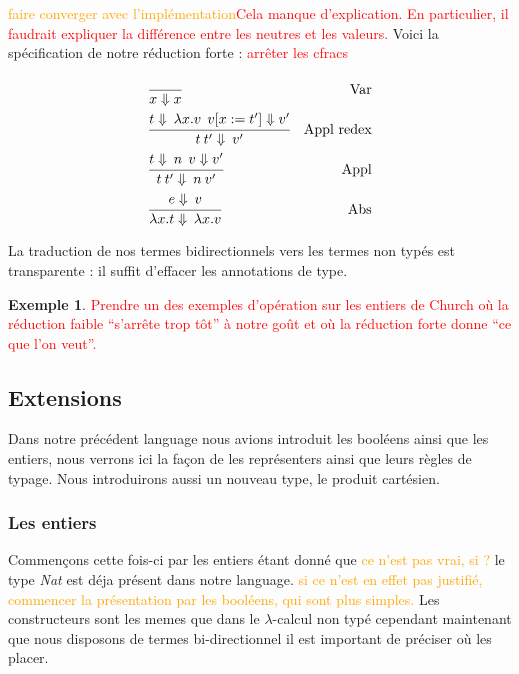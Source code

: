 \documentclass {article}
\theoremstyle{definition}
\newtheorem{example}{Exemple}
\theoremstyle{remark}
\newcommand{\todo}[1]{\textcolor{red}{#1}}
\newcommand{\attention}[1]{\textcolor{orange}{#1}}
\begin{document}
\attention{faire converger avec l'implémentation}\todo{Cela manque d'explication. En particulier, il faudrait expliquer la différence entre les neutres et les valeurs.} Voici la spécification de notre réduction forte : \todo{arrêter les cfracs}
\begin{align*}
  &\cfrac{}
  {x \Downarrow x}&\mbox{Var} \\
  &\cfrac{t \Downarrow \: \lambda x.v \:\: v[x := t']\Downarrow v'}
  {t\:t'\Downarrow \: v'}&\mbox{Appl redex} \\
  &\cfrac{t \Downarrow \: n \:\: v \Downarrow v'}
  {t\:t'\Downarrow \: n \: v'}&\mbox{Appl} \\
  &\cfrac{e \Downarrow \: v}
  {\lambda x.t \Downarrow \: \lambda x.v}&\mbox{Abs}
\end{align*}

La traduction de nos termes bidirectionnels vers les termes non typés
est transparente : il suffit d'effacer les annotations de type.

\begin{example}
  \todo{Prendre un des exemples d'opération sur les entiers de Church
    où la réduction faible ``s'arrête trop tôt'' à notre goût et où la
    réduction forte donne ``ce que l'on veut''.}
\end{example}

\subsection{Extensions} 

Dans notre précédent language nous avions introduit les booléens ainsi que les entiers,
nous verrons ici la façon de les représenters ainsi que leurs règles de typage.
Nous introduirons aussi un nouveau type, le produit cartésien.

\subsubsection{Les entiers}
\label{entier_type}

Commençons cette fois-ci par les entiers étant donné que \attention{ce n'est pas vrai, si ?} le type \emph{Nat}
est déja présent dans notre language. \attention{si ce n'est en effet pas justifié, commencer la présentation par les booléens, qui sont plus simples.}
Les constructeurs sont les memes que dans le \(\lambda\)-calcul non typé 
cependant maintenant que nous disposons de termes bi-directionnel il est important
de préciser où les placer.
\end{document}
